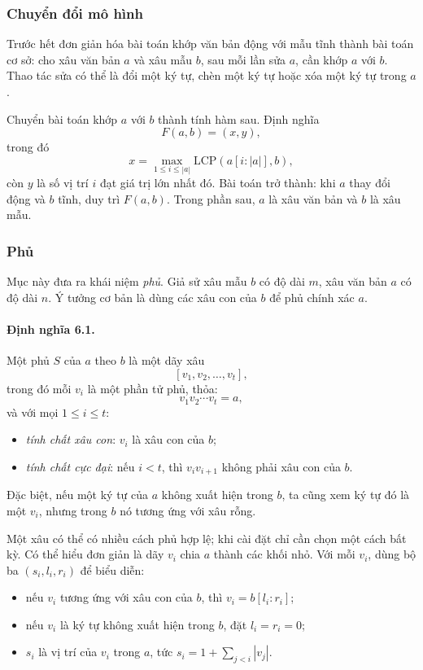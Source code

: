 \documentclass[11pt]{article}
\begin{document}
\subsubsection{Chuyển đổi mô hình}

Trước hết đơn giản hóa bài toán khớp văn bản động với mẫu tĩnh thành bài toán
cơ sở: cho xâu văn bản \(a\) và xâu mẫu \(b\), sau mỗi lần sửa \(a\), cần khớp
\(a\) với \(b\). Thao tác sửa có thể là đổi một ký tự, chèn một ký tự hoặc xóa
một ký tự trong \(a\).

Chuyển bài toán khớp \(a\) với \(b\) thành tính hàm sau. Định nghĩa
\[
  F(a,b)=(x,y),
\]
trong đó
\[
  x=\max_{1\le i\le |a|}\mathrm{LCP}(a[i:|a|],b),
\]
còn \(y\) là số vị trí \(i\) đạt giá trị lớn nhất đó. Bài toán trở thành: khi
\(a\) thay đổi động và \(b\) tĩnh, duy trì \(F(a,b)\). Trong phần sau, \(a\) là
xâu văn bản và \(b\) là xâu mẫu.

\subsubsection{Phủ}

Mục này đưa ra khái niệm \emph{phủ}. Giả sử xâu mẫu \(b\) có độ dài \(m\), xâu
văn bản \(a\) có độ dài \(n\). Ý tưởng cơ bản là dùng các xâu con của \(b\) để
phủ chính xác \(a\).

\paragraph{Định nghĩa 6.1.}
Một phủ \(S\) của \(a\) theo \(b\) là một dãy xâu
\[
  [v_1,v_2,\ldots,v_t],
\]
trong đó mỗi \(v_i\) là một phần tử phủ, thỏa:
\[
  v_1v_2\cdots v_t=a,
\]
và với mọi \(1\le i\le t\):
\begin{itemize}
  \item \emph{tính chất xâu con}: \(v_i\) là xâu con của \(b\);
  \item \emph{tính chất cực đại}: nếu \(i<t\), thì \(v_iv_{i+1}\) không phải xâu
  con của \(b\).
\end{itemize}
Đặc biệt, nếu một ký tự của \(a\) không xuất hiện trong \(b\), ta cũng xem ký tự
đó là một \(v_i\), nhưng trong \(b\) nó tương ứng với xâu rỗng.

Một xâu có thể có nhiều cách phủ hợp lệ; khi cài đặt chỉ cần chọn một cách bất
kỳ. Có thể hiểu đơn giản là dãy \(v_i\) chia \(a\) thành các khối nhỏ. Với mỗi
\(v_i\), dùng bộ ba \((s_i,l_i,r_i)\) để biểu diễn:
\begin{itemize}
  \item nếu \(v_i\) tương ứng với xâu con của \(b\), thì
  \(v_i=b[l_i:r_i]\);
  \item nếu \(v_i\) là ký tự không xuất hiện trong \(b\), đặt \(l_i=r_i=0\);
  \item \(s_i\) là vị trí của \(v_i\) trong \(a\), tức
  \(s_i=1+\sum_{j<i}|v_j|\).
\end{itemize}
\end{document}
